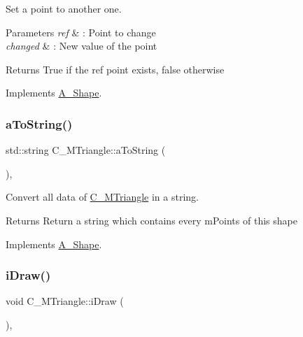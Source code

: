 Set a point to another one. 


\begin{DoxyParams}{Parameters}
{\em ref} & \+: Point to change \\
\hline
{\em changed} & \+: New value of the point \\
\hline
\end{DoxyParams}
\begin{DoxyReturn}{Returns}
True if the ref point exists, false otherwise 
\end{DoxyReturn}


Implements \hyperlink{classA__Shape_a6996f454b337f8425ad13cba3f7a7c35}{A\+\_\+\+Shape}.

\mbox{\label{classC__MTriangle_a3a769eb21278ec456292d88385b332a2}} 
\subsubsection{\texorpdfstring{a\+To\+String()}{aToString()}}
{\footnotesize\ttfamily std\+::string C\+\_\+\+M\+Triangle\+::a\+To\+String (\begin{DoxyParamCaption}{ }\end{DoxyParamCaption})\hspace{0.3cm}{\ttfamily [override]}, {\ttfamily [virtual]}}



Convert all data of \hyperlink{classC__MTriangle}{C\+\_\+\+M\+Triangle} in a string. 

\begin{DoxyReturn}{Returns}
Return a string which contains every m\+Points of this shape 
\end{DoxyReturn}


Implements \hyperlink{classA__Shape_ad8804b4e74543db374af6892367b7c2e}{A\+\_\+\+Shape}.

\mbox{\label{classC__MTriangle_ae75dd212f0b580664affc740945c8d0b}} 
\subsubsection{\texorpdfstring{i\+Draw()}{iDraw()}\hspace{0.1cm}{\footnotesize\ttfamily [1/2]}}
{\footnotesize\ttfamily void C\+\_\+\+M\+Triangle\+::i\+Draw (\begin{DoxyParamCaption}{ }\end{DoxyParamCaption})\hspace{0.3cm}{\ttfamily [override]}, {\ttfamily [virtual]}}



